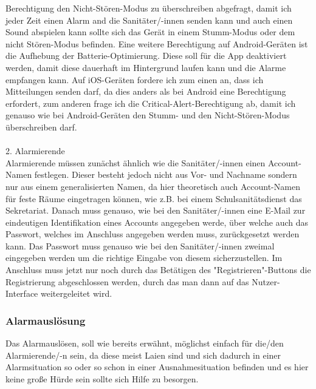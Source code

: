         Berechtigung den Nicht-Stören-Modus zu überschreiben abgefragt, damit ich jeder 
        Zeit einen Alarm and die Sanitäter/-innen senden kann und auch einen Sound abspielen 
        kann sollte sich das Gerät in einem Stumm-Modus oder dem nicht Stören-Modus 
        befinden. Eine weitere Berechtigung auf Android-Geräten ist die Aufhebung der
        Batterie-Optimierung. Diese soll für die App deaktiviert werden, damit diese
        dauerhaft im Hintergrund laufen kann und die Alarme empfangen kann. Auf 
        iOS-Geräten fordere ich zum einen an, dass ich Mitteilungen senden darf, da 
        dies anders als bei Android eine Berechtigung erfordert, zum anderen frage 
        ich die Critical-Alert-Berechtigung ab, damit ich genauso wie bei 
        Android-Geräten den Stumm- und den Nicht-Stören-Modus überschreiben darf.
        \\\\ 2. Alarmierende
        \\ Alarmierende müssen zunächst ähnlich wie die Sanitäter/-innen einen 
        Account-Namen festlegen. Dieser besteht jedoch nicht aus Vor- und Nachname 
        sondern nur aus einem generalisierten Namen, da hier theoretisch auch 
        Account-Namen für feste Räume eingetragen können, wie z.B. bei einem 
        Schulsanitätsdienst das Sekretariat. Danach muss genauso, wie bei den 
        Sanitäter/-innen eine E-Mail zur eindeutigen Identifikation eines Accounts
        angegeben werde, über welche auch das Passwort, welches im Anschluss 
        angegeben werden muss, zurückgesetzt werden kann. Das Passwort muss genauso
        wie bei den Sanitäter/-innen zweimal eingegeben werden um die richtige 
        Eingabe von diesem sicherzustellen. Im Anschluss muss jetzt nur noch durch
        das Betätigen des "Registrieren"-Buttons die Registrierung abgeschlossen 
        werden, durch das man dann auf das Nutzer-Interface weitergeleitet wird.


\subsubsection{Alarmauslösung}
    Das Alarmauslösen, soll wie bereits erwähnt, möglichst einfach für die/den 
    Alarmierende/-n sein, da diese meist Laien sind und sich dadurch in einer
    Alarmsituation so oder so schon in einer Ausnahmesituation befinden und es hier 
    keine große Hürde sein sollte sich Hilfe zu besorgen.

